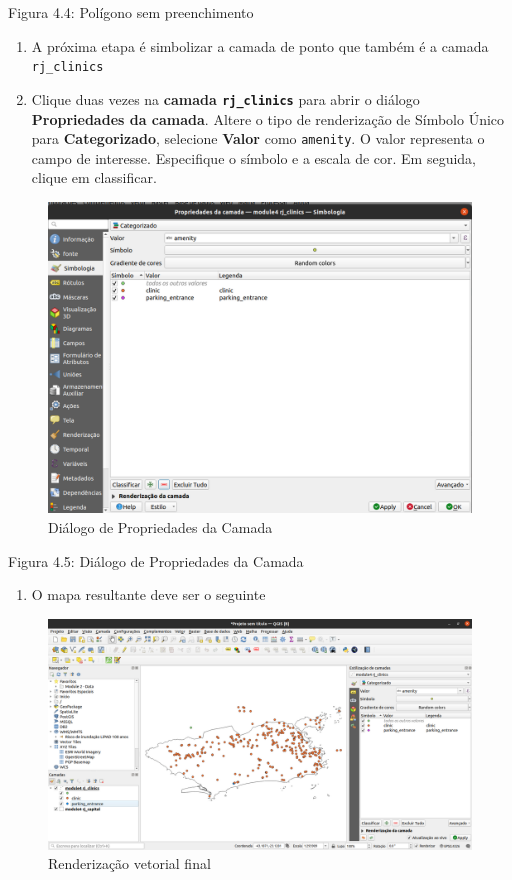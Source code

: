 \documentclass[
]{book}
\providecommand{\tightlist}{%
  \setlength{\itemsep}{0pt}\setlength{\parskip}{0pt}}
\begin{document}
Figura 4.4: Polígono sem preenchimento

\begin{enumerate}
\def\labelenumi{\arabic{enumi}.}
\setcounter{enumi}{7}
\tightlist
\item
  A próxima etapa é simbolizar a camada de ponto que também é a camada \texttt{rj\_clinics}
\item
  Clique duas vezes na \textbf{camada \texttt{rj\_clinics}} para abrir o diálogo \textbf{Propriedades da camada}. Altere o tipo de renderização de Símbolo Único para \textbf{Categorizado}, selecione \textbf{Valor} como \texttt{amenity}. O valor representa o campo de interesse. Especifique o símbolo e a escala de cor. Em seguida, clique em classificar.
\end{enumerate}

\begin{figure}
\centering
\includegraphics{media/modulo4/vector-style.png}
\caption{Diálogo de Propriedades da Camada}
\end{figure}

Figura 4.5: Diálogo de Propriedades da Camada

\begin{enumerate}
\def\labelenumi{\arabic{enumi}.}
\setcounter{enumi}{9}
\tightlist
\item
  O mapa resultante deve ser o seguinte
\end{enumerate}

\begin{figure}
\centering
\includegraphics{media/modulo4/final-vector-render.png}
\caption{Renderização vetorial final}
\end{figure}
\end{document}
